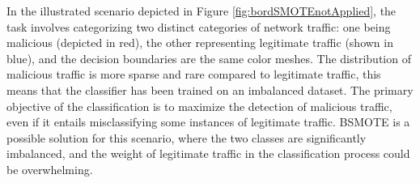 In the illustrated scenario depicted in Figure \ref{fig:bordSMOTEnotApplied}, the task involves categorizing two distinct categories of network traffic: 
one being malicious (depicted in red), the other representing legitimate traffic (shown in blue), and the decision boundaries are the same color meshes.
The distribution of malicious traffic is more sparse and rare compared to legitimate traffic, this means that the classifier has been trained on an imbalanced dataset. 
The primary objective of the classification is to maximize the detection of malicious traffic, even if it entails misclassifying some instances of legitimate traffic. 
BSMOTE is a possible solution for this scenario, where the two classes are significantly imbalanced, and the weight of legitimate traffic in the classification process could be overwhelming.

